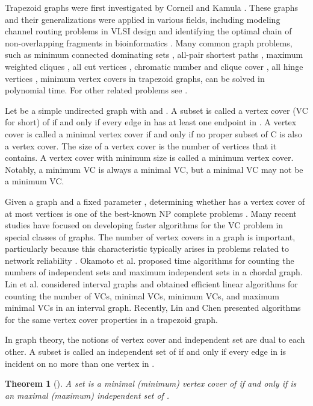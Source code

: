 \documentclass[11pt,letter]{article}
\newtheorem{thm}{Theorem}[section]
\begin{document}
Trapezoid graphs were first investigated by Corneil and Kamula \cite{CoKa87}. These graphs and
their generalizations were applied in various fields, including modeling channel routing problems
in VLSI design \cite{DaGoPi88} and identifying the optimal chain of non-overlapping fragments in
bioinformatics \cite{AbOh05}. Many common graph problems, such as minimum connected dominating sets
\cite{TsLiHs07}, all-pair shortest paths \cite{MoPaPa02}, maximum weighted cliques \cite{BePaPa02},
all cut vertices \cite{HoPaPa04}, chromatic number and clique cover \cite{FeMuWe97}, all hinge
vertices \cite{BePaPa03}, minimum vertex covers \cite{LiCh09} in trapezoid graphs, can be solved in
polynomial time. For other related problems see \cite{ChCo96,CrGa10,Li94,Li95}.

Let  be a simple undirected graph with  and . A subset  is called a vertex cover (VC for short) of  if and only if every edge in  has at least one
endpoint in . A vertex cover  is called a minimal vertex cover if and only if no proper
subset of C is also a vertex cover. The size of a vertex cover is the number of vertices that it
contains. A vertex cover with minimum size is called a minimum vertex cover. Notably, a minimum VC
is always a minimal VC, but a minimal VC may not be a minimum VC.

Given a graph  and a fixed parameter , determining whether  has a vertex cover of at most
 vertices is one of the best-known NP complete problems \cite{Ka72}. Many recent studies have
focused on developing faster algorithms for the VC problem in special classes of graphs. The number
of vertex covers in a graph is important, particularly because this characteristic typically arises
in problems related to network reliability \cite{PrBa83}. Okamoto et al. \cite{OkUnUe05} proposed
 time algorithms for counting the numbers of independent sets and maximum independent
sets in a chordal graph. Lin et al. \cite{Li07,LiCh08} considered interval graphs and obtained
efficient linear  algorithms for counting the number of VCs, minimal VCs, minimum VCs, and
maximum minimal VCs in an interval graph. Recently, Lin and Chen \cite{LiCh09} presented 
algorithms for the same vertex cover properties in a trapezoid graph.

In graph theory, the notions of vertex cover and independent set are dual to each other. A subset
 is called an independent set of  if and only if every edge in  is incident on
no more than one vertex in .

\begin{thm}[\cite{CoLeRiSt01}]
\label{thm-ind} A set  is a minimal (minimum) vertex cover of  if and only if  is an
maximal (maximum) independent set of .
\end{thm}
\end{document}
